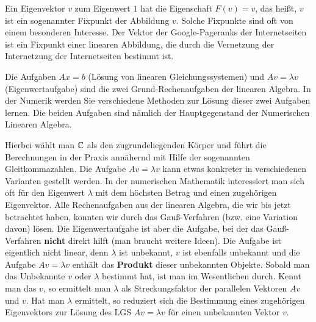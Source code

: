 \begin{bem}
Ein Eigenvektor $v$ zum Eigenwert $1$ hat die Eigenschaft $F(v) = v$, das heißt, $v$ ist ein sogenannter Fixpunkt der Abbildung $v$. Solche Fixpunkte sind oft von einem besonderen Interesse. Der Vektor der Google-Pageranks der Internetseiten ist ein Fixpunkt einer linearen Abbildung, die durch die Vernetzung der Internetzung der Internetseiten bestimmt ist.
\end{bem}

\begin{bem}
Die Aufgaben $A x = b$ (Lösung von linearen Gleichungssystemen) und $A v = \lambda v$ (Eigenwertaufgabe) sind die zwei Grund-Rechenaufgaben der linearen Algebra. In der Numerik werden Sie verschiedene Methoden zur Lösung dieser zwei Aufgaben lernen. Die beiden Aufgaben sind nämlich der Hauptgegenstand der Numerischen Linearen Algebra. 

Hierbei wählt man $\mathbb C$ als den zugrundeliegenden Körper und führt die Berechnungen in der Praxis annähernd mit Hilfe der sogenannten Gleitkommazahlen.  Die Aufgabe $A v = \lambda v$ kann etwas konkreter in verschiedenen Varianten gestellt werden. In der numerischen Mathematik interessiert man sich oft für den Eigenwert $\lambda$ mit dem höchsten Betrag und einen zugehörigen Eigenvektor. Alle Rechenaufgaben aus der linearen Algebra, die wir bis jetzt betrachtet haben, konnten wir durch das Gauß-Verfahren (bzw. eine Variation davon) lösen. Die Eigenwertaufgabe ist aber die Aufgabe, bei der das Gauß-Verfahren \textbf{nicht} direkt hilft (man braucht weitere Ideen). Die Aufgabe ist eigentlich nicht linear, denn $\lambda$ ist unbekannt, $v$ ist ebenfalls unbekannt und die Aufgabe $A v = \lambda v$ enthält das \textbf{Produkt} dieser unbekannten Objekte. Sobald man das Unbekannte $v$ oder $\lambda$ bestimmt hat, ist man im Wesentlichen durch. Kennt man das $v$, so ermittelt man $\lambda$ als Streckungsfaktor der parallelen Vektoren $A v$ und $v$. Hat man $\lambda$ ermittelt, so reduziert sich die Bestimmung eines zugehörigen Eigenvektors zur Lösung des LGS $A v= \lambda v$ für einen unbekannten Vektor $v$.
\end{bem}


